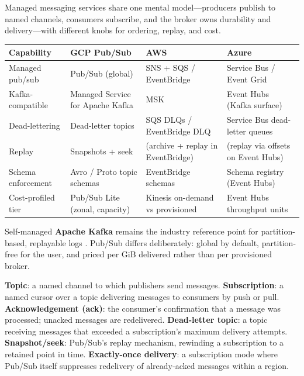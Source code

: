 \begin{crosscloud}
Managed messaging services share one mental model---producers publish to named channels, consumers subscribe, and the broker owns durability and delivery---with different knobs for ordering, replay, and cost.

\vspace{2mm}
{\footnotesize
\begin{tabular}{@{}p{2.8cm}p{3.0cm}p{3.0cm}p{3.0cm}@{}} \\
\toprule
\textbf{Capability} & \textbf{GCP Pub/Sub} & \textbf{AWS} & \textbf{Azure} \\
\midrule
Managed pub/sub & Pub/Sub (global) & SNS + SQS / EventBridge & Service Bus / Event Grid \\
Kafka-compatible & Managed Service for Apache Kafka & MSK & Event Hubs (Kafka surface) \\
Dead-lettering & Dead-letter topics & SQS DLQs / EventBridge DLQ & Service Bus dead-letter queues \\
Replay & Snapshots + seek & (archive + replay in EventBridge) & (replay via offsets on Event Hubs) \\
Schema enforcement & Avro / Proto topic schemas & EventBridge schemas & Schema registry (Event Hubs) \\
Cost-profiled tier & Pub/Sub Lite (zonal, capacity) & Kinesis on-demand vs provisioned & Event Hubs throughput units \\
\bottomrule
\end{tabular}}

\vspace{1mm}
Self-managed \textbf{Apache Kafka} remains the industry reference point for partition-based, replayable logs \cite{apachekafkadocs}. Pub/Sub differs deliberately: global by default, partition-free for the user, and priced per GiB delivered rather than per provisioned broker.
\end{crosscloud}

\begin{keyterms}
\textbf{Topic}: a named channel to which publishers send messages.
\textbf{Subscription}: a named cursor over a topic delivering messages to consumers by push or pull.
\textbf{Acknowledgement (ack)}: the consumer's confirmation that a message was processed; unacked messages are redelivered.
\textbf{Dead-letter topic}: a topic receiving messages that exceeded a subscription's maximum delivery attempts.
\textbf{Snapshot/seek}: Pub/Sub's replay mechanism, rewinding a subscription to a retained point in time.
\textbf{Exactly-once delivery}: a subscription mode where Pub/Sub itself suppresses redelivery of already-acked messages within a region.
\end{keyterms}

